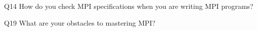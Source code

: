 \begin{description}%
\item{Q14} How do you check MPI specifications when you are writing MPI programs?%
\item{Q19} What are your obstacles to mastering MPI?%
\end{description}%
